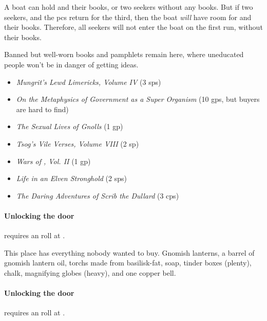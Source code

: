 \begin{multicols}{2}
A boat can hold  and their books, or two \glspl{seeker} without any books.
But if two \glspl{seeker}, and the \glspl{pc} return for the third, then the boat \emph{will} have room for  and their books.
Therefore, all \glspl{seeker} will not enter the boat on the first run, without their books.





Banned but well-worn books and pamphlets remain here, where uneducated people won't be in danger of getting ideas.

\begin{itemize}
  \item
  \textit{Mungrit's Lewd Limericks, Volume IV} (3 \glspl{sp})
  \item
  \textit{On the Metaphysics of Government as a Super Organism} (10 \glspl{gp}, but buyers are hard to find)
  \item
  \textit{The Sexual Lives of Gnolls} (1 \gls{gp})
  \item
  \textit{Tsog's Vile Verses, Volume VIII} (2 sp)
  \item
  \textit{Wars of , Vol. II} (1 \gls{gp})
  \item
  \textit{Life in an Elven Stronghold} (2 \glspl{sp})
  \item
  \textit{The Daring Adventures of Scrib the Dullard} (3 \glspl{cp})
\end{itemize}

\paragraph{Unlocking the door}
requires an  roll at \tn[13].


This place has everything nobody wanted to buy.
Gnomish lanterns, a barrel of gnomish lantern oil, \glspl{torch} made from \gls{basilisk}-fat, soap, tinder boxes (plenty), chalk, magnifying globes (heavy), and one copper bell.

\paragraph{Unlocking the door}
requires an  roll at \tn[13].


\end{multicols}
